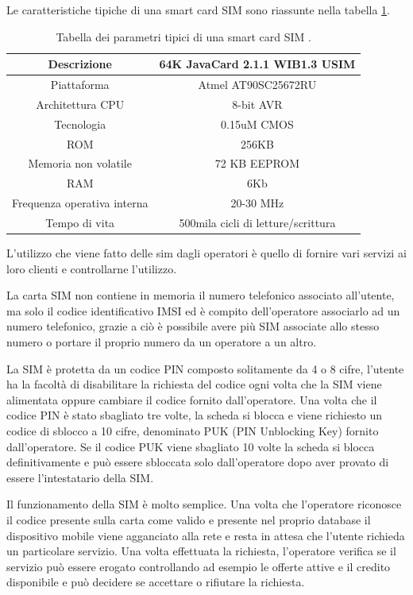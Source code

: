 Le caratteristiche tipiche di una smart card SIM sono riassunte nella tabella \ref{parametri_SIM}.

\begin{table}[h!]
\centering
\begin{tabular}{ |c|c| } 
 \hline
 Descrizione &  64K JavaCard 2.1.1 WIB1.3 USIM \\
 \hline
 Piattaforma & Atmel AT90SC25672RU \\ 
 \hline
 Architettura CPU & 8-bit AVR \\ 
 \hline
 Tecnologia & 0.15uM CMOS \\ 
 \hline
 ROM & 256KB \\
 \hline
 Memoria non volatile & 72 KB EEPROM \\
 \hline
 RAM & 6Kb \\
 \hline
 Frequenza operativa interna & 20-30 MHz \\
 \hline
 Tempo di vita & 500mila cicli di letture/scrittura \\
 \hline
 
\end{tabular}
\caption{Tabella dei parametri tipici di una smart card SIM \cite{secret_life}.}
\label{parametri_SIM}
\end{table}

L'utilizzo che viene fatto delle sim dagli operatori è quello di fornire vari servizi ai loro clienti e controllarne l'utilizzo.

La carta SIM non contiene in memoria il numero telefonico associato all'utente, ma solo il codice identificativo IMSI ed è compito dell'operatore associarlo ad un numero telefonico, grazie a ciò è possibile avere più SIM associate allo stesso numero o portare il proprio numero da un operatore a un altro.

La SIM è protetta da un codice PIN composto solitamente da 4 o 8 cifre, l'utente ha la facoltà di disabilitare la richiesta del codice ogni volta che la SIM viene alimentata oppure cambiare il codice fornito dall'operatore. Una volta che il codice PIN è stato sbagliato tre volte, la scheda si blocca e viene richiesto un codice di sblocco a 10 cifre, denominato PUK (PIN Unblocking Key) fornito dall'operatore. Se il codice PUK viene sbagliato 10 volte la scheda si blocca definitivamente e può essere sbloccata solo dall'operatore dopo aver provato di essere l'intestatario della SIM.

Il funzionamento della SIM è molto semplice. Una volta che l'operatore riconosce il codice presente sulla carta come valido e presente nel proprio database il dispositivo mobile viene agganciato alla rete e resta in attesa che l'utente richieda un particolare servizio. Una volta effettuata la richiesta, l'operatore verifica se il servizio può essere erogato controllando ad esempio le offerte attive e il credito disponibile e può decidere se accettare o rifiutare la richiesta.
\cite{Wiki_sim}

